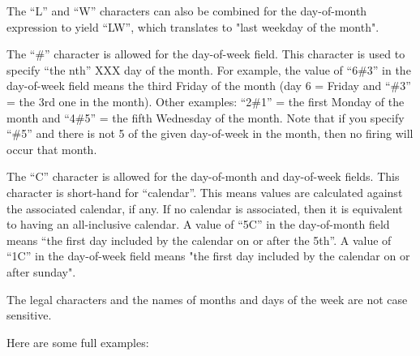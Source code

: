 \documentclass{InsightBook}
\begin{document}
The ``L'' and ``W'' characters can also be combined for the day-of-month
expression to yield ``LW'', which translates to "last weekday of the
month".

The ``\#'' character is allowed for the day-of-week field. This character
is used to specify ``the nth'' XXX day of the month. For example, the
value of ``6\#3'' in the day-of-week field means the third Friday of the
month (day 6 = Friday and ``\#3'' = the 3rd one in the month). Other
examples: ``2\#1'' = the first Monday of the month and ``4\#5'' = the fifth
Wednesday of the month. Note that if you specify ``\#5'' and there is not
5 of the given day-of-week in the month, then no firing will occur
that month.

The ``C'' character is allowed for the day-of-month and day-of-week
fields. This character is short-hand for ``calendar''. This means values
are calculated against the associated calendar, if any. If no calendar
is associated, then it is equivalent to having an all-inclusive
calendar. A value of ``5C'' in the day-of-month field means ``the first
day included by the calendar on or after the 5th''. A value of ``1C'' in
the day-of-week field means "the first day included by the calendar on
or after sunday".

The legal characters and the names of months and days of the week are
not case sensitive.

Here are some full examples:
\end{document}
